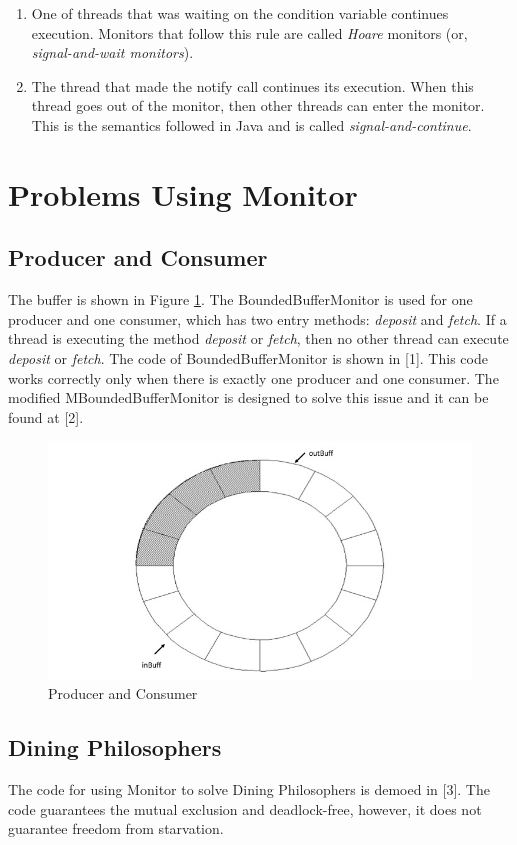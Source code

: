 \documentclass[twoside]{article}
\renewcommand{\cite}[1]{[#1]}
\begin{document}
\begin{enumerate}
	\item One of threads that was waiting on the condition variable continues execution. Monitors that follow this rule are called \textit{Hoare} monitors (or, \textit{signal-and-wait monitors}).
	\item The thread that made the notify call continues its execution. When this thread goes out of the monitor, then other threads can enter the monitor. This is the semantics followed in Java and is called \textit{signal-and-continue}.
\end{enumerate}

\section{Problems Using Monitor}
\subsection{Producer and Consumer}
The buffer is shown in Figure \ref{fig:pc}. The BoundedBufferMonitor is used for one producer and one consumer, which has two entry methods: \textit{deposit} and \textit{fetch}. If a thread is executing the method \textit{deposit} or \textit{fetch}, then no other thread can execute \textit{deposit} or \textit{fetch}. The code of BoundedBufferMonitor is shown in \cite{1}. This code works correctly only when there is exactly one producer and one consumer. The modified MBoundedBufferMonitor is designed to solve this issue and it can be found at \cite{2}.
\begin{figure}[ht]
  \centering
  \includegraphics[height=0.250\textheight,width=1.0\linewidth]{./pc.jpg} 
  \caption{Producer and Consumer}
  \label{fig:pc}
\end{figure}
\subsection{Dining Philosophers}
The code for using Monitor to solve Dining Philosophers is demoed in \cite{3}. The code guarantees the mutual exclusion and deadlock-free, however, it does not guarantee freedom from starvation.  
\end{document}
